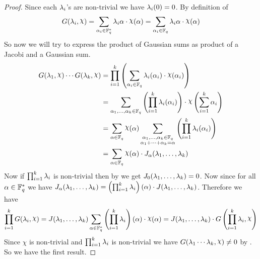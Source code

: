 \begin{proof}
  Since each $\lambda_i$'s are non-trivial we have $\lambda_i(0)=0$. By definition of $$G(\lm_i,\chi)=\sum_{\alpha_i\in\bbF_q^*}\lm_i{\alpha}\cdot \chi(\alpha)=\sum_{\alpha_i\in\bbF_q}\lm_i{\alpha}\cdot \chi(\alpha)$$So now we will try to express the product of Gaussian sums as product of a Jacobi and a Gaussian sum. 
  \begin{align}
    G(\lm_1,\chi)\cdots G(\lm_k,\chi) & = \prod_{i=1}^k \lt(\sum_{\alpha_i\in\bbF_q}\lm_i(\alpha_i)\cdot \chi(\alpha_i)\rt) \nonumber\\
    & = \sum_{\alpha_1,\dots,\alpha_k\in\bbF_q}\lt( \prod_{i=1}^k\lm_i(\alpha_i) \rt) \cdot \chi\lt( \sum_{i=1}^k \alpha_i \rt)\nonumber\\
    & =\sum_{\alpha\in\bbF_q}\chi(\alpha)\sum_{\substack{\alpha_1,\dots,\alpha_k\in\bbF_q\\ \alpha_1+\cdots+\alpha_k=\alpha}}\lt( \prod_{i=1}^k\lm_i(\alpha_i) \rt)\nonumber\\
    & = \sum_{\alpha\in\bbF_q}\chi(\alpha)\cdot J_{\alpha}(\lm_1,\dots,\lm_k)\label{eq:gauss-prod-jacobi-sum}
  \end{align}
  Now if $\prod_{i=1}^k \lambda_i$ is non-trivial then by  we get $J_0(\lambda_1,\dots, \lambda_k)=0$. Now since for all $\alpha\in\mathbb{F}_q^*$ we have $J_{\alpha}(\lambda_1,\dots,\lambda_k)=\left(\prod_{i=1}^k\lambda_i\right)(\alpha)\cdot J(\lambda_1,\dots,\lambda_k)$. Therefore we have $$\prod_{i=1}^k G(\lm_i,\chi)=J(\lm_1,\dots,\lm_k)\sum_{\alpha\in\bbF_q^*}\lt(\prod_{i=1}^k\lm_i\rt)(\alpha)\cdot \chi(\alpha)= J(\lm_1,\dots,\lm_k)\cdot G\lt(\prod_{i=1}^k\lm_i,\chi\rt)$$Since $\chi$ is non-trivial and $\prod_{i=1}^k\lambda_i$ is non-trivial we have $G(\lm_1\cdots\lm_k,\chi)\neq 0$ by . So we have the first result. 


\end{proof}
